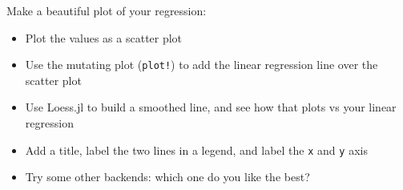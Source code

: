 \documentclass[11pt]{article}
\providecommand{\tightlist}{%
      \setlength{\itemsep}{0pt}\setlength{\parskip}{0pt}}
\begin{document}
Make a beautiful plot of your regression:

\begin{itemize}
\tightlist
\item
  Plot the values as a scatter plot
\item
  Use the mutating plot (\texttt{plot!}) to add the linear regression
  line over the scatter plot
\item
  Use Loess.jl to build a smoothed line, and see how that plots vs your
  linear regression
\item
  Add a title, label the two lines in a legend, and label the \texttt{x}
  and \texttt{y} axis
\item
  Try some other backends: which one do you like the best?
\end{itemize}


    
    
    
    
\end{document}
